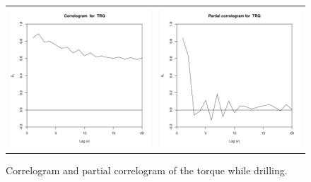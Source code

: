 \begin{figure}[ht!]
\begin{center}
\begin{tabular}{c@{}c}
\includegraphics[scale=0.4]{./figures/Verdande_Corr_TRQ.pdf} &
\includegraphics[scale=0.4]{./figures/Verdande_ParCorr_TRQ.pdf}  \\
\end{tabular}
\caption{\label{Figure:VTTorqueAutoCorr} Correlogram and partial correlogram of the torque while drilling.}
\end{center}
\end{figure}


